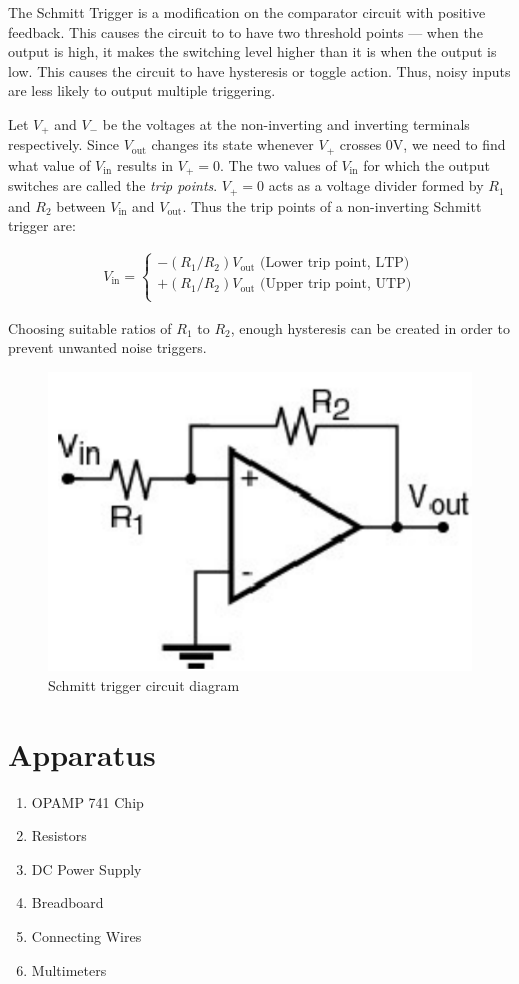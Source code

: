 The Schmitt Trigger is a modification on the comparator circuit with positive feedback. This causes the circuit to to have two threshold points --- when the output is high, it makes the switching level higher than it is when the output is low. This causes the circuit to have hysteresis or toggle action.
Thus, noisy inputs are less likely to output multiple triggering.

Let $V_+$ and $V_-$ be the voltages at the non-inverting and inverting terminals respectively.
Since $V_\text{out}$ changes its state whenever $V_+$ crosses 0V, we need to find what value of $V_\text{in}$ results in $V_+ = 0$. The two values of $V_\text{in}$ for which the output switches are called the \textit{trip points}. $V_+ = 0$ acts as a voltage divider formed by $R_1$ and $R_2$ between $V_\text{in}$ and $V_\text{out}$. Thus the trip points of a non-inverting Schmitt trigger are: 

\begin{align}
    V_\text{in} = \begin{cases}
        -(R_1/R_2)V_\text{out} \text{ (Lower trip point, LTP)}\\
        +(R_1/R_2)V_\text{out} \text{ (Upper trip point, UTP)}\\
    \end{cases}
\end{align}

Choosing suitable ratios of $R_1$ to $R_2$, enough hysteresis can be created in order to prevent unwanted noise triggers. 

\begin{figure}[H]
    \centering
    \includegraphics[width=0.5\columnwidth]{images/schmitt.png}
    \caption{Schmitt trigger circuit diagram}
    \label{schmitt}
\end{figure}

\section{Apparatus}

\begin{enumerate}
    \item OPAMP 741 Chip
    \item Resistors
    \item DC Power Supply
    \item Breadboard
    \item Connecting Wires
    \item Multimeters
\end{enumerate}